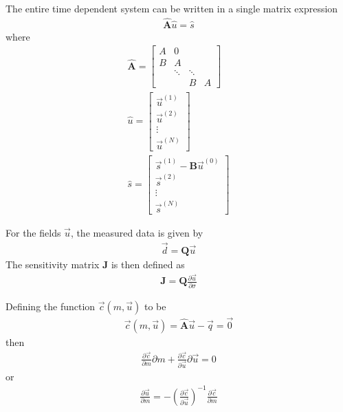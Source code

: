 \documentclass[]{article}
\newcommand{\s}{\vec{s}}
\renewcommand {\u}  { {\vec u} }
\begin{document}
The entire time dependent system can be written in a single matrix expression
\begin{align}
    \hat{\mathbf{A}} \hat{u} = \hat{s}
\end{align}
where
\begin{subequations}
    \begin{align}
        \mathbf{\hat{A}} = \left[
        \begin{array}{cccc}
            A & 0 & & \\
            B & A & & \\
              & \ddots & \ddots & \\
              & & B & A
        \end{array}
        \right] \\
        \hat{u} = \left[
            \begin{array}{c}
                \u^{(1)} \\
                \u^{(2)} \\
                \vdots \\
                \u^{(N)}
            \end{array} \right]\\
        \hat{s} = \left[
            \begin{array}{c}
                \s^{(1)} - \mathbf{B} \u^{(0)} \\
                \s^{(2)} \\
                \vdots \\
                \s^{(N)}
            \end{array}
        \right]
    \end{align}
\end{subequations}

For the fields $\u$, the measured data is given by
\begin{align}
    \vec{d} = \mathbf{Q} \u
\end{align}
The sensitivity matrix $\mathbf{J}$ is then defined as
\begin{align}
    \mathbf{J} = \mathbf{Q} \frac{\partial \u}{\partial \sigma}
\end{align}


Defining the function $\vec{c}(m,\vec{u})$ to be
\begin{align}
    \vec{c}(m,\u) = \hat{\mathbf{A}} \vec{u} - \vec{q} = \vec{0}
\end{align}
then
\begin{align}
    \frac{\partial \vec{c}}{\partial m} \partial m
    + \frac{\partial \vec{c}}{\partial \u} \partial \vec{u} = 0
\end{align}
or
\begin{align}
    \frac{\partial \vec{u}}{\partial m} = -\left(\frac{\partial \vec{c}}{\partial \u} \right)^{-1} \frac{\partial \vec{c}}{\partial m}
\end{align}
\end{document}

